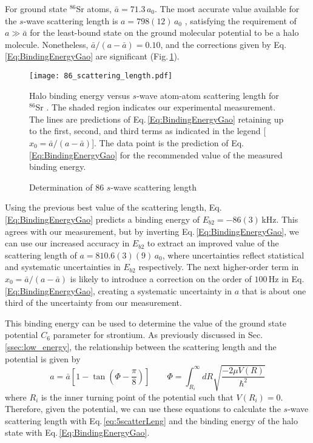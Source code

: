 For ground state $^{86}$Sr atoms, $\bar{a}=71.3$\,$a_0$.
The most accurate value available for the $s$-wave scattering length is $a=798 (12)$\,$a_0$ \cite{Stein2010}, satisfying the requirement of $a\gg \bar{a}$ for the least-bound state on the ground molecular potential to be a halo molecule.
Nonetheless, ${\bar{a}}/({a-\bar{a}})=0.10$, and the corrections given by Eq.\,\ref{Eq:BindingEnergyGao} are significant (Fig.\,\ref{fig:HaloBindingEnergy}).
	\begin{figure} 
	\centerline{
	  \texttt{[image: 86\_scattering\_length.pdf]}}
	  \caption{Determination of 86 $s$-wave scattering length}{Halo binding energy versus $s$-wave atom-atom scattering length for $^{86}$Sr . The shaded region indicates our experimental measurement. The lines are predictions of Eq.\,\ref{Eq:BindingEnergyGao} retaining up to the first, second, and third terms as indicated in the legend [$x_0={\bar{a}}/({a-\bar{a}})$]. The data point is the prediction of Eq.\,\ref{Eq:BindingEnergyGao} for the recommended value of the measured binding energy.}
	  \label{fig:HaloBindingEnergy}
	\end{figure}
Using the previous best value of the scattering length, Eq.\,\ref{Eq:BindingEnergyGao} predicts a binding energy of $E_{b2}=-86(3)$\,kHz.
This agrees with our measurement, but by inverting Eq.\,\ref{Eq:BindingEnergyGao}, we can use our increased accuracy in $E_{b2}$ to extract an improved value of the scattering length of $a=810.6(3)(9)$\,$a_0$, where uncertainties reflect statistical and systematic uncertainties in $E_{b2}$ respectively.
The next higher-order term in $x_0={\bar{a}}/({a-\bar{a}})$ is likely to introduce a correction on the order of $100$\,Hz in Eq.\,\ref{Eq:BindingEnergyGao}, creating a systematic uncertainty in $a$ that is about one third of the uncertainty from our measurement.

This binding energy can be used to determine the value of the ground state potential $C_6$ parameter for strontium.
As previously discussed in Sec.\,\ref{ssec:low_energy}, the relationship between the scattering length and the potential is given by
\begin{equation} \label{eq:5scatterLeng}
	a = \bar{a} \left[ 1 - \tan(\Phi - \frac{\pi}{8}) \right] \quad \quad \Phi = \int_{R_i}^{\infty} dR \sqrt{\frac{-2\mu V(R)}{\hbar^2}}
\end{equation} 
where $R_i$ is the inner turning point of the potential such that $V(R_i)=0$.
Therefore, given the potential, we can use these equations to calculate the $s$-wave scattering length with Eq.\,\ref{eq:5scatterLeng} and the binding energy of the halo state with Eq.\,\ref{Eq:BindingEnergyGao}.

